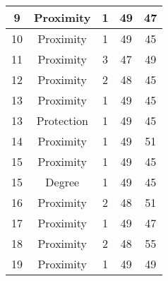 \documentclass[results.tex]{subfiles}
\begin{document}
\begin{center}
\begin{tabular}{| c || c | c | c | c |}
            \hline
            9                       & Proximity                    & 1                      & 49                      & 47                   \\
            \hline
            10                      & Proximity                    & 1                      & 49                      & 45                   \\
            \hline
            11                      & Proximity                    & 3                      & 47                      & 49                   \\
            \hline
            12                      & Proximity                    & 2                      & 48                      & 45                   \\
            \hline
            13                      & Proximity                    & 1                      & 49                      & 45                   \\
            \hline
            13                      & Protection                   & 1                      & 49                      & 45                   \\
            \hline
            14                      & Proximity                    & 1                      & 49                      & 51                   \\
            \hline
            15                      & Proximity                    & 1                      & 49                      & 45                   \\
            \hline
            15                      & Degree                       & 1                      & 49                      & 45                   \\
            \hline
            16                      & Proximity                    & 2                      & 48                      & 51                   \\
            \hline
            17                      & Proximity                    & 1                      & 49                      & 47                   \\
            \hline
            18                      & Proximity                    & 2                      & 48                      & 55                   \\
            \hline
            19                      & Proximity                    & 1                      & 49                      & 49                   \\

\end{tabular}
\end{center}
\end{document}
